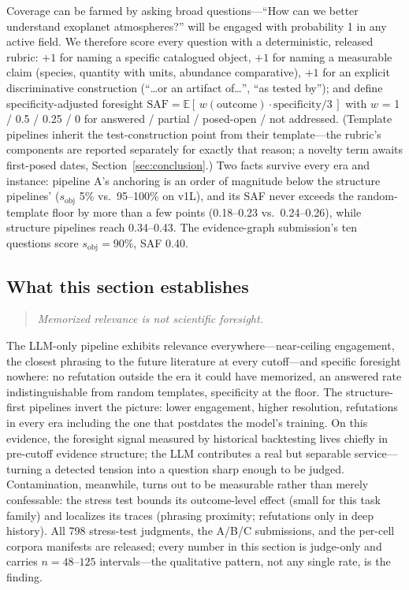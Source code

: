 Coverage can be farmed by asking broad questions---``How can we better
understand exoplanet atmospheres?'' will be engaged with probability 1
in any active field. We therefore score every question with a
deterministic, released rubric: $+1$ for naming a specific catalogued
object, $+1$ for naming a measurable claim (species, quantity with
units, abundance comparative), $+1$ for an explicit discriminative
construction (``\ldots or an artifact of\ldots'', ``as tested by'');
and define specificity-adjusted foresight
$\mathrm{SAF} = \mathbb{E}[\,w(\text{outcome}) \cdot \text{specificity}/3\,]$
with $w$ = 1 / 0.5 / 0.25 / 0 for answered / partial / posed-open /
not addressed. (Template pipelines inherit the test-construction
point from their template---the rubric's components are reported
separately for exactly that reason; a novelty term awaits first-posed
dates, Section~\ref{sec:conclusion}.) Two facts survive every era and
instance: pipeline A's anchoring is an order of magnitude below the
structure pipelines' ($s_{\mathrm{obj}}$ 5\% vs.\ 95--100\% on v1L),
and its SAF never exceeds the random-template floor by more than a few
points (0.18--0.23 vs.\ 0.24--0.26), while structure pipelines reach
0.34--0.43. The evidence-graph submission's ten questions score
$s_{\mathrm{obj}}=90\%$, SAF 0.40.

\subsection{What this section establishes}

\begin{quote}
\emph{Memorized relevance is not scientific foresight.}
\end{quote}

The LLM-only pipeline exhibits relevance everywhere---near-ceiling
engagement, the closest phrasing to the future literature at every
cutoff---and specific foresight nowhere: no refutation outside the era
it could have memorized, an answered rate indistinguishable from random
templates, specificity at the floor. The structure-first pipelines
invert the picture: lower engagement, higher resolution, refutations in
every era including the one that postdates the model's training. On
this evidence, the foresight signal measured by historical backtesting
lives chiefly in pre-cutoff evidence structure; the LLM contributes a
real but separable service---turning a detected tension into a
question sharp enough to be judged. Contamination, meanwhile, turns
out to be measurable rather than merely confessable: the stress test
bounds its outcome-level effect (small for this task family) and
localizes its traces (phrasing proximity; refutations only in deep
history). All 798 stress-test judgments, the A/B/C submissions, and
the per-cell corpora manifests are released; every number in this
section is judge-only and carries $n=48$--$125$ intervals---the
qualitative pattern, not any single rate, is the finding.
